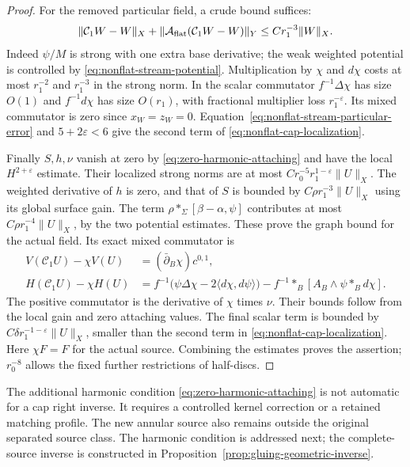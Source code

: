 \documentclass[11pt]{amsart}
\theoremstyle{definition}
\theoremstyle{remark}
\theoremstyle{plain}
\begin{document}
\begin{proof}
For the removed particular field, a crude bound suffices:
\[
 \|\mathcal C_1W-W\|_X+
 \|\mathcal A_{\rm flat}(\mathcal C_1W-W)\|_Y
                                      \leq Cr_1^{-3}\|W\|_X.
\]
Indeed $\psi/M$ is strong with one extra base derivative;
the weak weighted potential is controlled by
\eqref{eq:nonflat-stream-potential}. Multiplication by
$\chi$ and $d\chi$ costs at most $r_1^{-2}$ and $r_1^{-3}$
in the strong norm. In the scalar commutator
$f^{-1}\Delta\chi$ has size $O(1)$ and
$f^{-1}d\chi$ has size $O(r_1)$, with fractional
multiplier loss $r_1^{-\varepsilon}$.
Its mixed commutator is zero since $x_W=z_W=0$.
Equation~\eqref{eq:nonflat-stream-particular-error} and
$5+2\varepsilon<6$ give the second term of
\eqref{eq:nonflat-cap-localization}.

Finally $S,h,\nu$ vanish at zero by
\eqref{eq:zero-harmonic-attaching} and have the local
$H^{2+\varepsilon}$ estimate. Their localized strong
norms are at most $Cr_0^{-5}r_1^{1-\varepsilon}\|U\|_X$.
The weighted derivative of $h$ is zero, and that of $S$
is bounded by $C\rho r_1^{-3}\|U\|_X$ using its global
surface gain. The term
$\rho *_\Sigma[\beta-\alpha,\psi]$ contributes at most
$C\rho r_1^{-4}\|U\|_X$, by the two potential estimates.
These prove the graph bound for the actual field.
Its exact mixed commutator is
\begin{equation}\label{eq:nonflat-stream-commutator}
\begin{aligned}
 V(\mathcal C_1U)-\chi V(U)&=(\bar\partial_B\chi)c^{0,1},\\
 H(\mathcal C_1U)-\chi H(U)
 &=f^{-1}\bigl(\psi\Delta\chi-2\langle d\chi,d\psi\rangle\bigr)
       -f^{-1}*_B[A_B\wedge\psi *_Bd\chi].
\end{aligned}
\end{equation}
The positive commutator is the derivative of $\chi$ times
$\nu$. Their bounds follow from the local gain and zero
attaching values. The final scalar term is bounded by
$C\delta r_1^{-1-\varepsilon}\|U\|_X$, smaller than the
second term in \eqref{eq:nonflat-cap-localization}.
Here $\chi F=F$ for the actual source. Combining the
estimates proves the assertion; $r_0^{-8}$ allows the
fixed further restrictions of half-discs.
\end{proof}

The additional harmonic condition
\eqref{eq:zero-harmonic-attaching} is not automatic for a
cap right inverse. It requires a controlled kernel correction
or a retained matching profile. The new annular source also
remains outside the original separated source class.
The harmonic condition is addressed next; the complete-source inverse
is constructed in Proposition~\ref{prop:gluing-geometric-inverse}.
\end{document}
